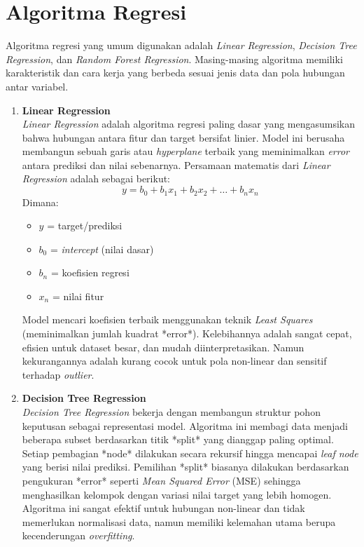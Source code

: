 \documentclass[a4paper,oneside,11pt]{book}
\begin{document}
\section{Algoritma Regresi}
Algoritma regresi yang umum digunakan adalah \textit{Linear Regression}, \textit{Decision Tree Regression}, dan \textit{Random Forest Regression}. Masing-masing algoritma memiliki karakteristik dan cara kerja yang berbeda sesuai jenis data dan pola hubungan antar variabel.

\begin{enumerate}
    \item \textbf{Linear Regression}\\
    \textit{Linear Regression} adalah algoritma regresi paling dasar yang mengasumsikan bahwa hubungan antara fitur dan target bersifat linier. Model ini berusaha membangun sebuah garis atau \textit{hyperplane} terbaik yang meminimalkan \textit{error} antara prediksi dan nilai sebenarnya. Persamaan matematis dari \textit{Linear Regression} adalah sebagai berikut:
    \begin{equation}
        y = b_0 + b_1x_1 + b_2x_2 + \dots + b_nx_n
    \end{equation}
    Dimana:
    \begin{itemize}
        \item $y$ = target/prediksi
        \item $b_0$ = \textit{intercept} (nilai dasar)
        \item $b_n$ = koefisien regresi
        \item $x_n$ = nilai fitur
    \end{itemize}
    Model mencari koefisien terbaik menggunakan teknik \textit{Least Squares} (meminimalkan jumlah kuadrat *error*). Kelebihannya adalah sangat cepat, efisien untuk dataset besar, dan mudah diinterpretasikan. Namun kekurangannya adalah kurang cocok untuk pola non-linear dan sensitif terhadap \textit{outlier}.

    \item \textbf{Decision Tree Regression}\\
    \textit{Decision Tree Regression} bekerja dengan membangun struktur pohon keputusan sebagai representasi model. Algoritma ini membagi data menjadi beberapa subset berdasarkan titik *split* yang dianggap paling optimal. Setiap pembagian *node* dilakukan secara rekursif hingga mencapai \textit{leaf node} yang berisi nilai prediksi. Pemilihan *split* biasanya dilakukan berdasarkan pengukuran *error* seperti \textit{Mean Squared Error} (MSE) sehingga menghasilkan kelompok dengan variasi nilai target yang lebih homogen. Algoritma ini sangat efektif untuk hubungan non-linear dan tidak memerlukan normalisasi data, namun memiliki kelemahan utama berupa kecenderungan \textit{overfitting}.


\end{enumerate}
\end{document}
